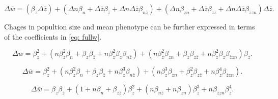 \documentclass{article}
\begin{document}
 \begin{equation} 
 \Delta \bar{w} =  (\beta_{z}\Delta \bar{z}) + (\Delta n\beta_{n} + \Delta \bar{z} \beta_{\bar{z}} + \Delta n \Delta \bar{z} \beta_{n\bar{z}}) + ( \Delta n  \beta_{zn} + \Delta \bar{z} \beta_{z\bar{z}} + \Delta n \Delta\bar{z} \beta_{\bar{z}zn})\Delta \bar{z}.
 \end{equation}
 
 Chages in popultion size and mean phenotype can be further expressed in terms of the coefficients in \ref{eq: fullw}.
 
 \begin{equation} 
 \Delta \bar{w} =  \beta_{z}^2 + (n\beta_{z}^2\beta_{n} +\beta_{z} \beta_{\bar{z}} + n\beta_{z}^2\beta_{z} \beta_{n\bar{z}}) + ( n\beta_{z}^2  \beta_{zn} + \beta_{z}\beta_{z\bar{z}} + n\beta_{z}^2 \beta_{z} \beta_{\bar{z}zn})\beta_{z}.
 \end{equation}
 
 \begin{equation} 
 \Delta \bar{w} =  \beta_{z}^2 + (n\beta_{z}^2\beta_{n} +\beta_{z} \beta_{\bar{z}} + n\beta_{z}^3 \beta_{n\bar{z}}) + ( n\beta_{z}^3  \beta_{zn} + \beta_{z}^2\beta_{z\bar{z}} + n\beta_{z}^4  \beta_{\bar{z}zn}).
 \end{equation}
 
  \begin{equation} 
 \Delta \bar{w} =  \beta_{z} \beta_{\bar{z}} + (1 +n\beta_{n} +  \beta_{z\bar{z}})\beta_{z}^2  + (n\beta_{n\bar{z}} + n \beta_{zn})\beta_{z}^3  +  n  \beta_{\bar{z}zn} \beta_{z}^4.
 \end{equation}
 
 
\end{document}
